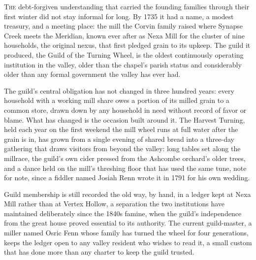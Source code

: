 \documentclass[11pt,twoside]{book}
\begin{document}
\lettrine[lines=3,loversize=0.12]{\textcolor{heritageGreen}{T}}{he} debt-forgiven understanding that carried the founding families through their first winter did not stay informal for long. By 1735 it had a name, a modest treasury, and a meeting place: the mill the Corvin family raised where Synapse Creek meets the Meridian, known ever after as Nexa Mill for the cluster of nine households, the original nexus, that first pledged grain to its upkeep. The guild it produced, the Guild of the Turning Wheel, is the oldest continuously operating institution in the valley, older than the chapel's parish status and considerably older than any formal government the valley has ever had.

The guild's central obligation has not changed in three hundred years: every household with a working mill share owes a portion of its milled grain to a common store, drawn down by any household in need without record of favor or blame. What has changed is the occasion built around it. The Harvest Turning, held each year on the first weekend the mill wheel runs at full water after the grain is in, has grown from a single evening of shared bread into a three-day gathering that draws visitors from beyond the valley: long tables set along the millrace, the guild's own cider pressed from the Ashcombe orchard's older trees, and a dance held on the mill's threshing floor that has used the same tune, note for note, since a fiddler named Josiah Renn wrote it in 1791 for his own wedding.

Guild membership is still recorded the old way, by hand, in a ledger kept at Nexa Mill rather than at Vertex Hollow, a separation the two institutions have maintained deliberately since the 1840s famine, when the guild's independence from the great house proved essential to its authority. The current guild-master, a miller named Osric Fenn whose family has turned the wheel for four generations, keeps the ledger open to any valley resident who wishes to read it, a small custom that has done more than any charter to keep the guild trusted.
\end{document}
